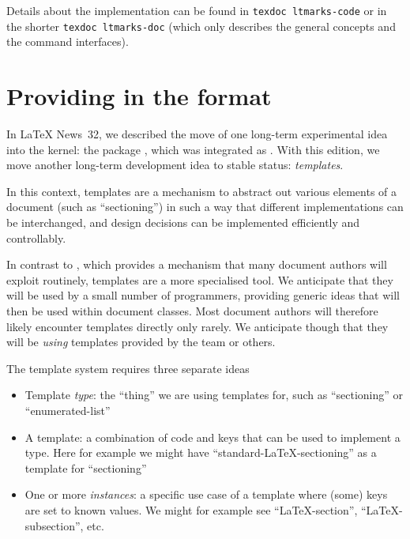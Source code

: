\documentclass{ltnews}
\begin{document}
Details about the implementation can be found in \texttt{texdoc
  ltmarks-code} or in the shorter \texttt{texdoc ltmarks-doc} (which
only describes the general concepts and  the command interfaces).


\section{Providing  in the format}

In \LaTeX{} News~32, we described the move of one long-term experimental idea
into the kernel: the package , which was integrated as .
With this edition, we move another long-term development idea to stable status:
\emph{templates}.

In this context, templates are a mechanism to abstract out various elements
of a document (such as \enquote{sectioning}) in such a way that different
implementations can be interchanged,
and design decisions can be implemented efficiently and controllably.

In contrast to , which provides a mechanism that many document
authors will exploit routinely, templates are a more specialised tool. We
anticipate that they will be used by a small number of programmers, providing
generic ideas that will then be used within document classes. Most document
authors will therefore likely encounter templates directly only rarely.
We anticipate though that they will be \emph{using} templates provided
by the team or others.


The template system requires three separate ideas
\begin{itemize}
  \item Template \emph{type}: the \enquote{thing} we are using templates
    for, such as \enquote{sectioning} or \enquote{enumerated-list}
  \item A template: a combination of code and keys that can be used
    to implement a type. Here for example we might have
    \enquote{standard-\LaTeX{}-sectioning} as a template for
    \enquote{sectioning}
  \item One or more \emph{instances}: a specific use case of a template
    where (some) keys are set to known values. We might for example see
    \enquote{\LaTeX{}-section}, \enquote{\LaTeX{}-subsection}, etc.
\end{itemize}
\end{document}
